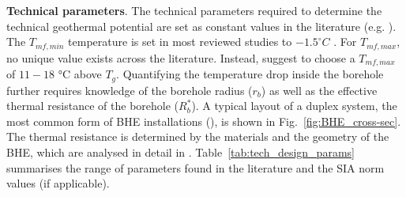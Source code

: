 \textbf{Technical parameters}. The technical parameters required to determine the technical geothermal potential are set as constant values in the literature (e.g. \cite{miglani_methodology_2018,rivera_increased_2017,zhang_critical_2017}). The $T_\mathit{mf,min}$ temperature is set in most reviewed studies to $-1.5^\circ C$ \citet{sia_sondes_2010}.
For $T_\mathit{mf,max}$, no unique value exists across the literature. Instead, \citet{kavanaugh_geothermal_2014} suggest to choose a $T_\mathit{mf,max}$ of $11 - 18$ °C above $T_g$.
Quantifying the temperature drop inside the borehole further requires knowledge of the borehole radius ($r_b$) as well as the effective thermal resistance of the borehole ($R_b^*$). A typical layout of a duplex system, the most common form of BHE installations (\cite{sia_sondes_2010}), is shown in Fig.~\ref{fig:BHE_cross-sec}. The thermal resistance is determined by the materials and the geometry of the BHE, which are analysed in detail in \citep{huber_erdwarmesonden_2005}. Table~\ref{tab:tech_design_params} summarises the range of parameters found in the literature and the SIA norm values (if applicable).

